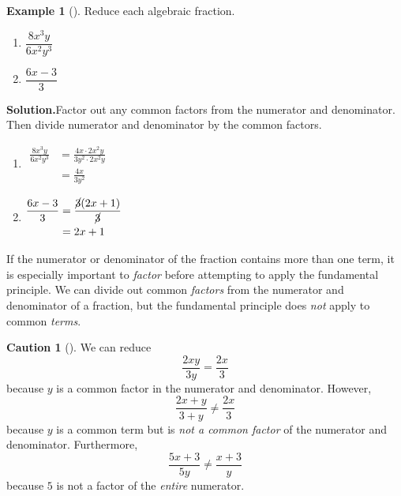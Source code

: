 \documentclass[10pt,]{book}
\theoremstyle{plain}
\theoremstyle{definition}
\newtheorem{warning}[theorem]{Caution}
\theoremstyle{definition}
\newtheorem{example}[theorem]{Example}
\theoremstyle{definition}
\numberwithin{equation}{part}
\newcommand{\amp}{&}
\begin{document}
\begin{example}[]\label{example-56}
Reduce each algebraic fraction. \leavevmode%
\begin{enumerate}[label=*\alph**]
\item\hypertarget{li-274}{}\(\dfrac{8x^3y}{6x^2y^3}\)%
\item\hypertarget{li-275}{}\(\dfrac{6x-3}{3}\)%
\end{enumerate}
%
\par\medskip\noindent%
\textbf{Solution.}\quad Factor out any common factors from the numerator and denominator. Then divide numerator and denominator by the common factors. \leavevmode%
\begin{enumerate}[label=*\alph**]
\item\hypertarget{li-276}{}\(\begin{aligned}
\frac{8x^3 y}{6x^2 y^3} \amp = \frac{4x \cdot 2x^2 y}{3y^2\cdot 2x^2 y} \\
\amp = \frac{4x}{3y^2}
\end{aligned}\)%
\item\hypertarget{li-277}{}\(\begin{aligned}
\frac{6x-3}{3} \amp = \frac{\cancel{3}(2x+1) }{\cancel{3}} \\
\amp = 2x+1
\end{aligned}\)%
\end{enumerate}
%
\end{example}
\par
If the numerator or denominator of the fraction contains more than one term, it is especially important to \emph{factor} before attempting to apply the fundamental principle. We can divide out common \emph{factors} from the numerator and denominator of a fraction, but the fundamental principle does \emph{not} apply to common \emph{terms}.%
\begin{warning}[]\label{warning-10}
We can reduce%
\begin{equation*}
\frac{2xy}{3y}= \frac{2x}{3} 
\end{equation*}
because \(y\) is a common factor in the numerator and denominator. However,%
\begin{equation*}
\frac{2x+y}{3+y} \ne \frac{2x}{3} 
\end{equation*}
because \(y\) is a common term but is \emph{not a common factor} of the numerator and denominator. Furthermore,%
\begin{equation*}
\frac{5x+3}{5y}\ne \frac{x+3}{y} 
\end{equation*}
because \(5\) is not a factor of the \emph{entire} numerator.%
\end{warning}
\end{document}

